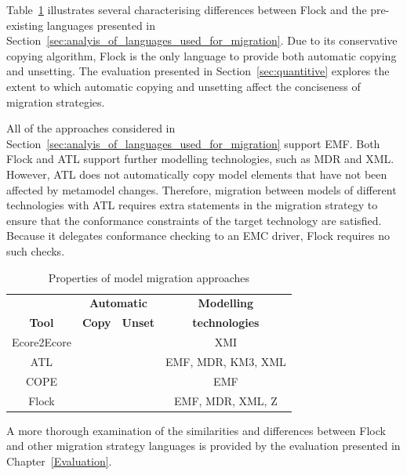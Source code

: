 Table~\ref{tab:differences} illustrates several characterising differences between Flock and the pre-existing languages presented in Section~\ref{sec:analyis_of_languages_used_for_migration}. Due to its conservative copying algorithm, Flock is the only language to provide both automatic copying and unsetting. The evaluation presented in Section~\ref{sec:quantitive} explores the extent to which automatic copying and unsetting affect the conciseness of migration strategies.

All of the approaches considered in Section~\ref{sec:analyis_of_languages_used_for_migration} support EMF. Both Flock and ATL support further modelling technologies, such as MDR and XML. However, ATL does not automatically copy model elements that have not been affected by metamodel changes. Therefore, migration between models of different technologies with ATL requires extra statements in the migration strategy to ensure that the conformance constraints of the target technology are satisfied. Because it delegates conformance checking to an EMC driver, Flock requires no such checks.

\begin{table}[tbp]
	\centering
	\begin{tabular}{|c|c|c|c|}
		\hline
		             & \multicolumn{2}{c|}{\textbf{Automatic}} & \textbf{Modelling} \\
		\textbf{Tool}& \textbf{Copy} & \textbf{Unset}          & \textbf{technologies} \\
		\hline
		Ecore2Ecore  & \tick             & \cross              & XMI                    \\
		\hline
		ATL          & \cross            & \tick               & EMF, MDR, KM3, XML     \\
		\hline
		COPE         & \tick             & \cross              & EMF                    \\
		\hline
		Flock        & \tick             & \tick               & EMF, MDR, XML, Z       \\
		\hline
	\end{tabular}
	\label{tab:differences}
	\caption{Properties of model migration approaches}
\end{table}

A more thorough examination of the similarities and differences between Flock and other migration strategy languages is provided by the evaluation presented in Chapter~\ref{Evaluation}.
